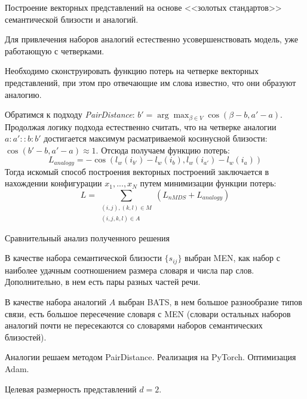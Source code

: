 \documentclass[9pt]{beamer}
\begin{document}
\begin{frame}{Построение векторных представлений на основе <<золотых стандартов>> семантической близости и аналогий.}
\vspace{\baselineskip}

Для привлечения наборов аналогий естественно усовершенствовать модель, уже работающую с четверками. 
\vspace{\baselineskip}

Необходимо сконструировать функцию потерь на четверке векторных представлений, при этом про отвечающие им слова известно, что они образуют аналогию. 

Обратимся к подходу \textit{PairDistance}: 
        $b' = \arg \max_{\beta \in V} \cos(\beta - b, a' - a)$. Продолжая логику подхода естественно считать, что на четверке аналогии $a:a' :: b:b'$ достигается максимум расматриваемой косинусной близости: $\cos(b'-b,a'-a) \approx 1$. Отсюда получаем функцию потерь:
\begin{equation}
    L_{analogy} = - \cos(l_w(i_{b'}) - l_w(i_b), l_w(i_{a'}) - l_w(i_a))
\end{equation}
Тогда искомый способ построения векторных построений заключается в нахождении конфигурации  $x_1, ..., x_N$ путем минимизации функции потерь:
\begin{equation}
    L = \sum_{\substack{(i, j), (k, l) \in M \\ (i, j, k, l) \in A}} (L_{nMDS} + L_{analogy})
\end{equation}
    
\end{frame}

\begin{frame}{Сравнительный анализ полученного решения}

В качестве набора семантической близости $\{s_{ij}\}$ выбран MEN, как набор с наиболее удачным соотношением размера словаря и числа пар слов. Дополнительно, в нем есть пары разных частей речи.
\vspace{\baselineskip}

В качестве набора аналогий $A$ выбран BATS, в нем большое разнообразие типов связи, есть большое пересечение словаря с MEN (словари остальных наборов аналогий почти не пересекаются со словарями наборов семантических близостей).
\vspace{\baselineskip}

Аналогии решаем методом PairDistance.
Реализация на PyTorch. Оптимизация Adam.

Целевая размерность представлений $d=2$.

\end{frame}
\end{document}
